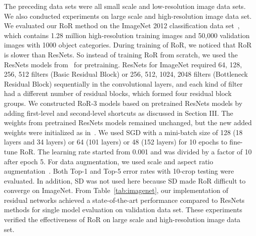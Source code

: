 \documentclass[journal]{IEEEtran}
\begin{document}
The preceding data sets were all small scale and low-resolution image data sets. We also conducted experiments on large scale and high-resolution image data set. We evaluated our RoR method on the ImageNet 2012 classification data set~\cite{Russ2014imagenetchallenge}, which contains 1.28 million high-resolution training images and 50,000 validation images with 1000 object categories. During training of RoR, we noticed that RoR is slower than ResNets. So instead of training  RoR from scratch, we used the ResNets models from~\cite{gross2016facebookres} for pretraining. ResNets for ImageNet required 64, 128, 256, 512 filters (Basic Residual Block) or 256, 512, 1024, 2048 filters (Bottleneck Residual Block) sequentially in the convolutional layers, and each kind of filter had a different number of residual blocks, which formed four residual block groups. We constructed RoR-3 models based on pretrained ResNets models by adding first-level and second-level shortcuts as discussed in Section III. The weights from pretrained ResNets models remained unchanged, but the new added weights were initialized as in~\cite{he2015prelu}. We used SGD with a mini-batch size of 128 (18 layers and 34 layers) or 64 (101 layers) or 48 (152 layers) for 10 epochs to fine-tune RoR. The learning rate started from 0.001 and was divided by a factor of 10 after epoch 5. For data augmentation, we used scale and aspect ratio augmentation~\cite{gross2016facebookres}. Both Top-1 and Top-5 error rates with 10-crop testing were evaluated. In addition, SD was not used here because SD made RoR difficult to converge on ImageNet. From Table~\ref{tab:imagenet}, our implementation of residual networks achieved a state-of-the-art performance compared to ResNets methods for single model evaluation on validation data set. These experiments verified the effectiveness of RoR on large scale and high-resolution image data set.
\end{document}
